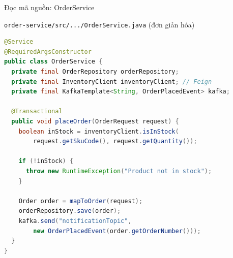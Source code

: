 \documentclass[aspectratio=169,12pt]{beamer}
\begin{document}
\begin{frame}[fragile,shrink=10]{Đọc mã nguồn: OrderService}
  \begin{block}{\small \texttt{order-service/src/.../OrderService.java} (đơn giản hóa)}
\begin{lstlisting}[language=java,basicstyle=\ttfamily\tiny]
@Service
@RequiredArgsConstructor
public class OrderService {
  private final OrderRepository orderRepository;
  private final InventoryClient inventoryClient; // Feign
  private final KafkaTemplate<String, OrderPlacedEvent> kafka;

  @Transactional
  public void placeOrder(OrderRequest request) {
    boolean inStock = inventoryClient.isInStock(
        request.getSkuCode(), request.getQuantity());

    if (!inStock) {
      throw new RuntimeException("Product not in stock");
    }

    Order order = mapToOrder(request);
    orderRepository.save(order);
    kafka.send("notificationTopic",
        new OrderPlacedEvent(order.getOrderNumber()));
  }
}
\end{lstlisting}
  \end{block}
\end{frame}
\end{document}
